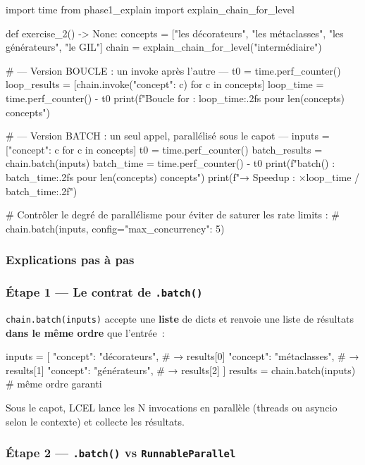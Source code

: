 \documentclass[11pt,a4paper]{article}
\begin{document}
\begin{pythoncode}
import time
from phase1_explain import explain_chain_for_level


def exercise_2() -> None:
    concepts = ["les décorateurs", "les métaclasses", "les générateurs", "le GIL"]
    chain = explain_chain_for_level("intermédiaire")

    # --- Version BOUCLE : un invoke après l'autre ---
    t0 = time.perf_counter()
    loop_results = [chain.invoke({"concept": c}) for c in concepts]
    loop_time = time.perf_counter() - t0
    print(f"Boucle for : {loop_time:.2f}s pour {len(concepts)} concepts")

    # --- Version BATCH : un seul appel, parallélisé sous le capot ---
    inputs = [{"concept": c} for c in concepts]
    t0 = time.perf_counter()
    batch_results = chain.batch(inputs)
    batch_time = time.perf_counter() - t0
    print(f"batch()    : {batch_time:.2f}s pour {len(concepts)} concepts")
    print(f"→ Speedup  : ×{loop_time / batch_time:.2f}")

    # Contrôler le degré de parallélisme pour éviter de saturer les rate limits :
    #   chain.batch(inputs, config={"max_concurrency": 5})
\end{pythoncode}

\subsubsection{Explications pas à pas}

\subsubsection*{Étape 1 — Le contrat de \texttt{.batch()}}

\texttt{chain.batch(inputs)} accepte une \textbf{liste} de dicts et
renvoie une liste de résultats \textbf{dans le même ordre} que l'entrée~:

\begin{pythoncode}
inputs = [
    {"concept": "décorateurs"},     # → results[0]
    {"concept": "métaclasses"},     # → results[1]
    {"concept": "générateurs"},     # → results[2]
]
results = chain.batch(inputs)       # même ordre garanti
\end{pythoncode}

Sous le capot, LCEL lance les N invocations en parallèle (threads ou
asyncio selon le contexte) et collecte les résultats.

\subsubsection*{Étape 2 — \texttt{.batch()} vs \texttt{RunnableParallel}}
\end{document}
